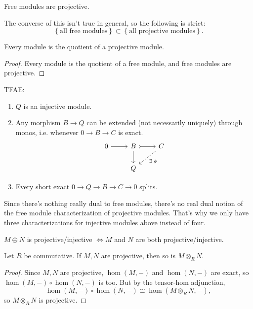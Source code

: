 \documentclass[twoside,10pt]{report}
\begin{document}
\begin{cor}
	Free modules are projective.
\end{cor}

The converse of this isn't true in general, so the following is strict:
\[
	\left\{ \text{all free modules} \right\} \subset \left\{ \text{all projective modules} \right\}.
\] 

\begin{cor}
Every module is the quotient of a projective module.
\end{cor}

\begin{proof}
	Every module is the quotient of a free module, and free modules are projective.
\end{proof}

\begin{thrm}
	TFAE:
	\begin{enumerate}
		\item $Q$ is an injective module.
		\item Any morphism $B\to Q$ can be extended (not necessarily uniquely) through monos, i.e. whenever $0\to B\to C$ is exact.
			\[
			\begin{tikzcd}
				0 \rar & B \rar[tail]\dar & C \arrow[dl,dashed,"\exists\;\phi"] \\
				       & Q
			\end{tikzcd}
			\] 
		\item Every short exact $0\to Q\to B\to C\to 0$ splits.
	\end{enumerate}
\end{thrm}

Since there's nothing really dual to free modules, there's no real dual notion of the free module characterization of projective modules. That's why we only have three characterizations for injective modules above instead of four.

\begin{prop}
$M \oplus N$ is projective/injective $\iff M$ and $N$ are both projective/injective.
\end{prop}

\begin{prop}
	Let $R$ be commutative. If $M,N$ are projective, then so is $M\otimes_{R}N$.
\end{prop}
\begin{proof}
	Since $M,N$ are projective, $\hom(M,-)$ and $\hom(N,-)$ are exact, so $\hom(M,-)\circ \hom(N,-)$ is too. But by the tensor-hom adjunction,
	\[
		\hom(M,-)\circ \hom(N,-) \cong \hom(M\otimes_{R}N,-),
	\] so $M\otimes_{R}N$ is projective.
\end{proof}
\end{document}
